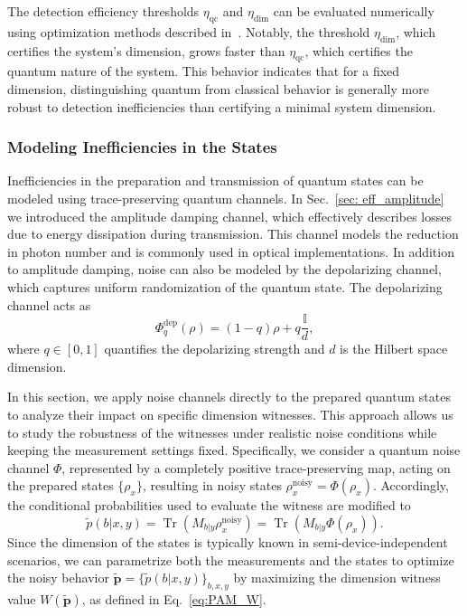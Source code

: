 \documentclass[aps,pra,reprint, superscriptaddress,showkeys]{revtex4-2}
\theoremstyle{plain}
\begin{document}
The detection efficiency thresholds \(\eta_{\mathrm{qc}}\) and \(\eta_{\mathrm{dim}}\) can be evaluated numerically using optimization methods described in~\cite{dallarno2012}. Notably, the threshold \(\eta_{\mathrm{dim}}\), which certifies the system’s dimension, grows faster than \(\eta_{\mathrm{qc}}\), which certifies the quantum nature of the system. This behavior indicates that for a fixed dimension, distinguishing quantum from classical behavior is generally more robust to detection inefficiencies than certifying a minimal system dimension.

\subsubsection{Modeling Inefficiencies in the States}
\label{sec: effreq_for_dw}
Inefficiencies in the preparation and transmission of quantum states can be modeled using trace-preserving quantum channels. In Sec.~\ref{sec: eff_amplitude} we introduced the amplitude damping channel, which effectively describes losses due to energy dissipation during transmission. This channel models the reduction in photon number and is commonly used in optical implementations. In addition to amplitude damping, noise can also be modeled by the depolarizing channel, which captures uniform randomization of the quantum state. The depolarizing channel acts as
\begin{equation}
    \Phi_q^{\mathrm{dep}}(\rho) = (1 - q) \rho + q \frac{\mathbb{I}}{d},
    \label{eq: pam_depolarizing}
\end{equation}
where \( q \in [0,1] \) quantifies the depolarizing strength and \( d \) is the Hilbert space dimension.

In this section, we apply noise channels directly to the prepared quantum states to analyze their impact on specific dimension witnesses. This approach allows us to study the robustness of the witnesses under realistic noise conditions while keeping the measurement settings fixed. Specifically, we consider a quantum noise channel \(\Phi\), represented by a completely positive trace-preserving map, acting on the prepared states \(\{\rho_x\}\), resulting in noisy states \(\rho_x^{\mathrm{noisy}} = \Phi(\rho_x)\). Accordingly, the conditional probabilities used to evaluate the witness are modified to
\begin{equation}
    \tilde{p}(b|x,y) = \operatorname{Tr}\left(M_{b|y} \rho_x^{\mathrm{noisy}}\right) = \operatorname{Tr}\left(M_{b|y} \Phi(\rho_x)\right).
\end{equation}
Since the dimension of the states is typically known in semi-device-independent scenarios, we can parametrize both the measurements and the states to optimize the noisy behavior \(\mathbf{\tilde{p}} = \{\tilde{p}(b|x,y)\}_{b,x,y}\) by maximizing the dimension witness value \(W(\mathbf{\tilde{p}})\), as defined in Eq.~\eqref{eq:PAM_W}.
\end{document}
